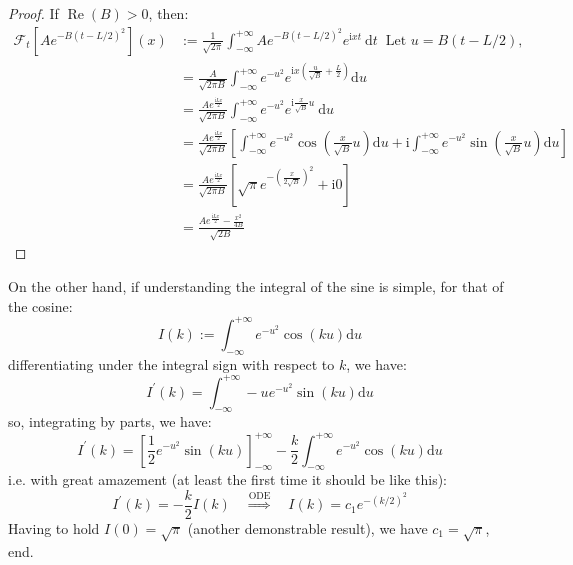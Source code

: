 \documentclass[main.tex]{subfiles}
\begin{document}
\begin{proof}
If $\operatorname{Re}(B)>0$, then:
$$
\begin{aligned}
\mathcal{F}_t\left[A e^{-B(t-L / 2)^2}\right](x) & :=\frac{1}{\sqrt{2 \pi}} \int_{-\infty}^{+\infty} A e^{-B(t-L / 2)^2} e^{\mathrm{i} x t} \mathrm{~d} t \;\; \text{Let 
$u = B(t - L/2)$,}\\
& =\frac{A}{\sqrt{2 \pi B}} \int_{-\infty}^{+\infty} e^{-u^2} e^{\mathrm{i} x\left(\frac{u}{\sqrt{B}}+\frac{L}{2}\right)} \mathrm{d} u \\
& =\frac{A e^{\frac{\mathrm{i} L x}{2}}}{\sqrt{2 \pi B}} \int_{-\infty}^{+\infty} e^{-u^2} e^{\mathrm{i} \frac{x}{\sqrt{B}} u} \mathrm{~d} u \\
& =\frac{A e^{\frac{\mathrm{i} L x}{2}}}{\sqrt{2 \pi B}}\left[\int_{-\infty}^{+\infty} e^{-u^2} \cos \left(\frac{x}{\sqrt{B}} u\right) \mathrm{d} u+\mathrm{i} \int_{-\infty}^{+\infty} e^{-u^2} \sin \left(\frac{x}{\sqrt{B}} u\right) \mathrm{d} u\right] \\
& =\frac{A e^{\frac{\mathrm{i} L x}{2}}}{\sqrt{2 \pi B}}\left[\sqrt{\pi} e^{-\left(\frac{x}{2 \sqrt{B}}\right)^2}+\mathrm{i} 0\right] \\
& =\frac{A e^{\frac{\mathrm{i} L x}{2}}-\frac{x^2}{4 B}}{\sqrt{2 B}}
\end{aligned}
$$
\end{proof}


On the other hand, if understanding the integral of the sine is simple, for that of the cosine:
$$
I(k):=\int_{-\infty}^{+\infty} e^{-u^2} \cos (k u) \mathrm{d} u
$$
differentiating under the integral sign with respect to $k$, we have:
$$
I^{\prime}(k)=\int_{-\infty}^{+\infty}-u e^{-u^2} \sin (k u) \mathrm{d} u
$$
so, integrating by parts, we have:
$$
I^{\prime}(k)=\left[\frac{1}{2} e^{-u^2} \sin (k u)\right]_{-\infty}^{+\infty}-\frac{k}{2} \int_{-\infty}^{+\infty} e^{-u^2} \cos (k u) \mathrm{d} u
$$
i.e. with great amazement (at least the first time it should be like this):
$$
I^{\prime}(k)=-\frac{k}{2} I(k) \quad \stackrel{\mathrm{ODE}}{\Rightarrow} \quad I(k)=c_1 e^{-(k / 2)^2}
$$
Having to hold $I(0)=\sqrt{\pi}$ (another demonstrable result), we have $c_1=\sqrt{\pi}$, end.
\end{document}
